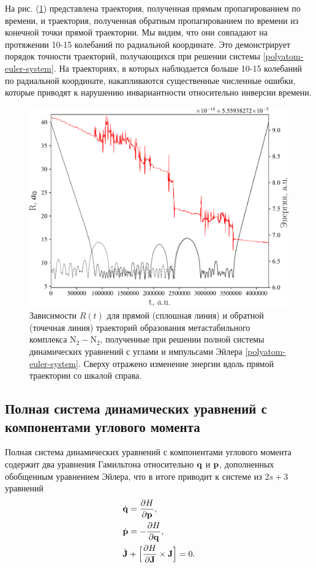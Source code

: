 На рис. (\ref{fig:euler-trajectory}) представлена траектория, полученная прямым пропагированием по времени, и траектория, полученная обратным пропагированием по времени из конечной точки прямой траектории. Мы видим, что они совпадают на протяжении 10-15 колебаний по радиальной координате. Это демонстрирует порядок точности траекторий, получающихся при решении системы \eqref{polyatom-euler-system}. На траекториях, в которых наблюдается больше 10-15 колебаний по радиальной координате, накапливаются существенные численные ошибки, которые приводят к нарушению инвариантности относительно инверсии времени.

\setcounter{figure}{3}
\begin{figure}[H]
    \centering
    \includegraphics[width=0.75\linewidth]{./pictures/trajectories/euler_trajectory-crop.pdf}
\caption{Зависимости $R(t)$ для прямой (сплошная линия) и обратной (точечная линия) траекторий образования метастабильного комплекса N$_2-$N$_2$, полученные при решении полной системы динамических уравнений с углами и импульсами Эйлера \eqref{polyatom-euler-system}. Сверху отражено изменение энергии вдоль прямой траектории со шкалой справа.}
    \label{fig:euler-trajectory}
\end{figure}

\subsection{Полная система динамических уравнений с компонентами углового момента}
    Полная система динамических уравнений с компонентами углового момента содержит два уравнения Гамильтона относительно $\mathbf{q}$ и $\mathbf{p}$, дополненных обобщенным уравнением Эйлера, что в итоге приводит к системе из $2s + 3$ уравнений
\begin{gather}
    \begin{aligned}
        &\dot{\mathbf{q}} = \frac{\partial H}{\partial \mathbf{p}}, \\
        &\dot{\mathbf{p}} = -\frac{\partial H}{\partial \mathbf{q}}, \\
        &\dot{\mathbf{J}} + \Big[ \frac{\partial H}{\partial \mathbf{J}} \times \mathbf{J} \Big] = 0.
    \end{aligned}
\end{gather}

